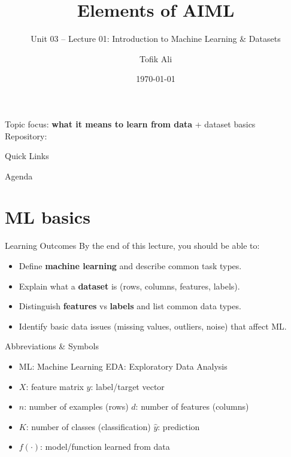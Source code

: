 \documentclass[aspectratio=169]{beamer}
\title[Elements of AIML]{Elements of AIML}
\subtitle{Unit 03 -- Lecture 01: Introduction to Machine Learning \& Datasets}
\author{Tofik Ali}
\institute{School of Computer Science, UPES Dehradun}
\date{\today}
\begin{document}
\UPESCoverFrame
\setcounter{framenumber}{0}

\begin{frame}
  \titlepage
  \vspace{0.3em}
  \begin{center}
    \footnotesize Topic focus: \textbf{what it means to learn from data} + dataset basics\\[0.25em]
    \footnotesize Repository: \texttt{\AIMLRepoURL}
  \end{center}
  \slidesources{\AIMLUnitIIISources}
\end{frame}

\begin{frame}{Quick Links}
  \centering
  \hyperlink{sec:ml}{}\hspace{0.6em}
  \hyperlink{sec:data}{}\hspace{0.6em}
  \hyperlink{sec:features}{}\hspace{0.6em}
  \hyperlink{sec:example}{}\hspace{0.6em}
  \hyperlink{sec:summary}{}
\end{frame}

\begin{frame}{Agenda}
  \tableofcontents
\end{frame}

\section{ML basics}
\label{sec:ml}

\begin{frame}{Learning Outcomes}
  By the end of this lecture, you should be able to:
  \begin{itemize}[<+->]
    \item Define \textbf{machine learning} and describe common task types.
    \item Explain what a \textbf{dataset} is (rows, columns, features, labels).
    \item Distinguish \textbf{features} vs \textbf{labels} and list common data types.
    \item Identify basic data issues (missing values, outliers, noise) that affect ML.
  \end{itemize}
\end{frame}

\begin{frame}{Abbreviations \& Symbols}
  \begin{itemize}[<+->]
    \item ML: Machine Learning \hfill EDA: Exploratory Data Analysis
    \item $X$: feature matrix \hfill $y$: label/target vector
    \item $n$: number of examples (rows) \hfill $d$: number of features (columns)
    \item $K$: number of classes (classification) \hfill $\hat{y}$: prediction
    \item $f(\cdot)$: model/function learned from data
  \end{itemize}
\end{frame}
\end{document}
